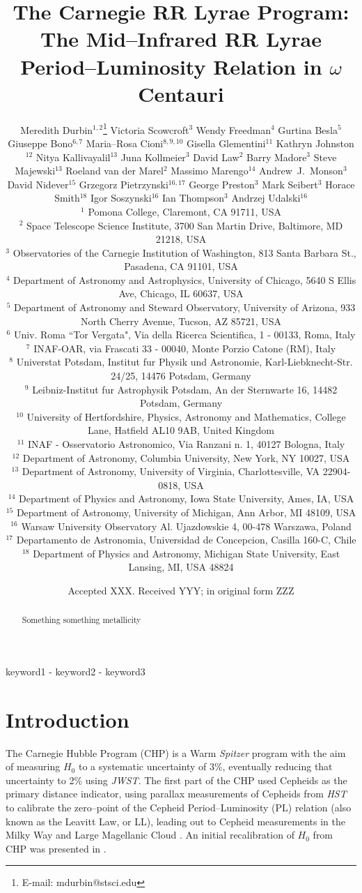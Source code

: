 \documentclass[a4paper,fleqn,usenatbib]{mnras}
\title[Mid--IR RR Lyrae PL Relation in $\omega$ Cen]{The Carnegie RR Lyrae Program: The Mid--Infrared RR Lyrae Period--Luminosity Relation in $\omega$ Centauri}
\author[M. Durbin et al.]{
Meredith Durbin$^{1,2}$\thanks{E-mail: mdurbin@stsci.edu}
Victoria Scowcroft$^{3}$
Wendy Freedman$^{4}$
Gurtina Besla$^{5}$ 
\newauthor Giuseppe Bono$^{6, 7}$
Maria--Rosa Cioni$^{8, 9, 10}$
Gisella Glementini$^{11}$
Kathryn Johnston$^{12}$
\newauthor Nitya Kallivayalil$^{13}$
Juna Kollmeier$^{3}$
David Law$^{2}$
Barry Madore$^{3}$
Steve Majewski$^{13}$
\newauthor Roeland van der Marel$^{2}$
Massimo Marengo$^{14}$
Andrew~J.~Monson$^{3}$
David Nidever$^{15}$ 
\newauthor
Grzegorz Pietrzynski$^{16, 17}$
George Preston$^{3}$
Mark Seibert$^{3}$
Horace Smith$^{18}$
\newauthor Igor Soszynski$^{16}$
Ian Thompson$^{3}$
Andrzej Udalski$^{16}$
\\
$^1$ Pomona College, Claremont, CA 91711, USA \\
$^2$ Space Telescope Science Institute, 3700 San Martin Drive, Baltimore, MD 21218, USA \\
$^3$ Observatories of the Carnegie Institution of Washington, 813 Santa Barbara St., Pasadena, CA 91101, USA \\
$^4$ Department of Astronomy and Astrophysics, University of Chicago, 5640 S Ellis Ave, Chicago, IL 60637, USA \\
$^5$ Department of Astronomy and Steward Observatory, University of Arizona, 933 North Cherry Avenue,   Tucson, AZ 85721, USA \\
$^6$ Univ. Roma ``Tor Vergata", Via della Ricerca Scientifica, 1 - 00133, Roma, Italy \\
$^7$ INAF-OAR, via Frascati 33 - 00040, Monte Porzio Catone (RM), Italy \\
$^8$ Universtat Potsdam, Institut fur Physik und Astronomie, Karl-Liebknecht-Str. 24/25, 14476 Potsdam, Germany \\
$^9$ Leibniz-Institut fur Astrophysik Potsdam, An der Sternwarte 16, 14482 Potsdam, Germany \\
$^{10}$ University of Hertfordshire, Physics, Astronomy and Mathematics, College Lane, Hatfield AL10 9AB, United Kingdom \\
$^{11}$ INAF - Osservatorio Astronomico, Via Ranzani n. 1, 40127 Bologna, Italy \\
$^{12}$ Department of Astronomy, Columbia University, New York, NY 10027, USA  \\
$^{13}$ Department of Astronomy, University of Virginia, Charlottesville, VA 22904-0818, USA \\
$^{14}$ Department of Physics and Astronomy, Iowa State University, Ames, IA, USA \\
$^{15}$ Department of Astronomy, University of Michigan, Ann Arbor, MI 48109, USA \\
$^{16}$ Warsaw University Observatory Al. Ujazdowskie 4, 00-478 Warszawa, Poland \\
$^{17}$ Departamento de Astronomia, Universidad de Concepcion, Casilla 160-C, Chile \\
$^{18}$ Department of Physics and Astronomy, Michigan State University, East Lansing, MI, USA 48824 \\
}
\date{Accepted XXX. Received YYY; in original form ZZZ}
\begin{document}
\label{firstpage}
\pagerange{\pageref{firstpage}-\pageref{lastpage}}
\maketitle

\begin{abstract}
Something something metallicity
\end{abstract}

\begin{keywords}
keyword1 - keyword2 - keyword3
\end{keywords}






\section{Introduction}
\label{sec:intro}
The Carnegie Hubble Program (CHP) is a Warm \textit{Spitzer} program with the aim of measuring $H_{0}$ to a systematic uncertainty of 3\%, eventually reducing that uncertainty to 2\% using \textit{JWST}. The first part of the CHP used Cepheids as the primary distance indicator, using parallax measurements of Cepheids from \textit{HST} \citep{2007AJ....133.1810B} to calibrate the zero--point of the Cepheid Period--Luminosity (PL) relation (also known as the Leavitt Law, or LL), leading out to Cepheid measurements in the Milky Way \citep[MW,][]{2012ApJ...759..146M} and Large Magellanic Cloud \citep[LMC,][]{2011ApJ...743...76S}. An initial recalibration of $H_{0}$ from CHP was presented in \citet{2012ApJ...758...24F}.
\end{document}
